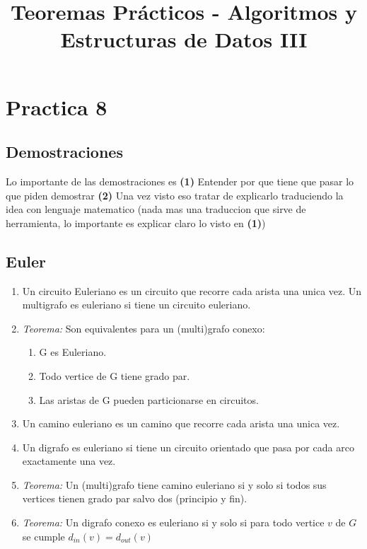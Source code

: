 \documentclass[a4paper, 11pt]{article}
\title{Teoremas Prácticos - Algoritmos y Estructuras de Datos III}
\begin{document}
\pagestyle{myheadings}
\maketitle

\thispagestyle{empty}
\tableofcontents

\newpage
\section{Practica 8}
\subsection{Demostraciones}
Lo importante de las demostraciones es \textbf{(1)} Entender por que tiene que pasar lo que piden demostrar \textbf{(2)} Una vez visto eso tratar de explicarlo traduciendo la idea con lenguaje matematico (nada mas una traduccion que sirve de herramienta, lo importante es explicar claro lo visto en \textbf{(1)})

\subsection{Euler}
\begin{enumerate}
\item Un circuito Euleriano es un circuito que recorre cada arista una unica vez. Un multigrafo es euleriano si tiene un circuito euleriano.
\item \textit{Teorema:} Son equivalentes para un (multi)grafo conexo:
   \begin{enumerate}
   \item G es Euleriano.
   \item Todo vertice de G tiene grado par.
   \item Las aristas de G pueden particionarse en circuitos.
   \end{enumerate}
\item Un camino euleriano es un camino que recorre cada arista una unica vez.
\item Un digrafo es euleriano si tiene un circuito orientado que pasa por cada arco exactamente una vez.
\item \textit{Teorema:} Un (multi)grafo tiene camino euleriano si y solo si todos sus vertices tienen grado par salvo dos (principio y fin).
\item \textit{Teorema:} Un digrafo conexo es euleriano si y solo si para todo vertice $v$ de $G$ se cumple $d_{in}(v) = d_{out}(v)$
\end{enumerate}
\end{document}
